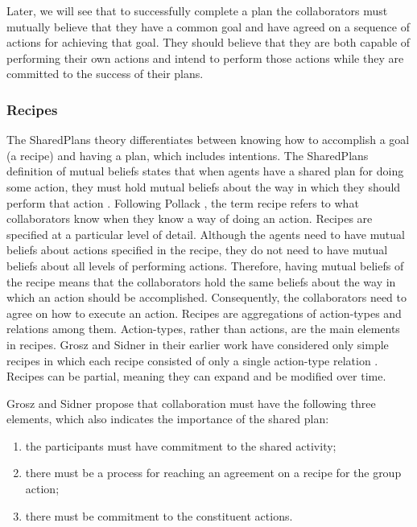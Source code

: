 \documentclass[12pt]{report}
\begin{document}
Later, we will see that to successfully complete a plan the collaborators must
mutually believe that they have a common goal and have agreed on a sequence of
actions for achieving that goal. They should believe that they are both capable
of performing their own actions and intend to perform those actions while they
are committed to the success of their plans.

\subsubsection{Recipes}
\label{sec:recipe}

The SharedPlans theory differentiates between knowing how to accomplish a goal
(a recipe) and having a plan, which includes intentions. The SharedPlans
definition of mutual beliefs states that when agents have a shared plan for
doing some action, they must hold mutual beliefs about the way in which they
should perform that action \cite{grosz:collaboration,grosz:plans-discourse}.
Following Pollack \cite{pollack:plan-mental-attitudes}, the term recipe refers
to what collaborators know when they know a way of doing an action. Recipes are
specified at a particular level of detail. Although the agents need to have
mutual beliefs about actions specified in the recipe, they do not need to have
mutual beliefs about all levels of performing actions. Therefore, having mutual
beliefs of the recipe means that the collaborators hold the same beliefs
about the way in which an action should be accomplished. Consequently, the
collaborators need to agree on how to execute an action. Recipes are
aggregations of action-types and relations among them. Action-types, rather than
actions, are the main elements in recipes. Grosz and Sidner in their earlier
work \cite{grosz:plans-discourse} have considered only simple recipes in which
each recipe consisted of only a single action-type relation
\cite{lochbaum:plan-models}. Recipes can be partial, meaning they can expand and
be modified over time.

Grosz and Sidner propose that collaboration must have the following three
elements, which also indicates the importance of the shared plan:

\begin{enumerate}
  \item the participants must have commitment to the shared activity;
  \item there must be a process for reaching an agreement on a recipe for the
  group action;
  \item there must be commitment to the constituent actions. 
\end{enumerate}
\end{document}
